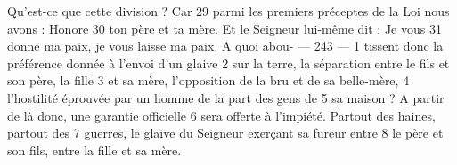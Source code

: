 Qu'est-ce que cette division ? Car	 
29	 	parmi les premiers préceptes de la Loi nous avons : Honore	 
30	 	ton père et ta mère. Et le Seigneur lui-même dit : Je vous	 
31	 	donne ma paix, je vous laisse ma paix. A quoi abou-	 
 	--- 243 ---	 
1	 	tissent donc la préférence donnée à l'envoi d'un glaive	 
2	 	sur la terre, la séparation entre le fils et son père, la fille	 
3	 	et sa mère, l'opposition de la bru et de sa belle-mère,	 
4	 	l'hostilité éprouvée par un homme de la part des gens de	 
5	 	sa maison ? A partir de là donc, une garantie officielle	 
6	 	sera offerte à l'impiété. Partout des haines, partout des	 
7	 	guerres, le glaive du Seigneur exerçant sa fureur entre	 
8	 	le père et son fils, entre la fille et sa mère.
